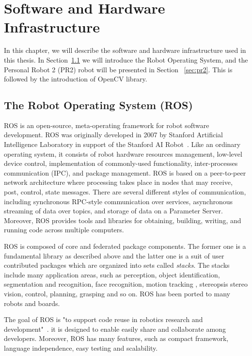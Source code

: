 \chapter{Software and Hardware Infrastructure}
\label{chapter:SHI}
In this chapter, we will describe the software and hardware
infrastructure used in this thesis. In Section~\ref{sec:ros} we will introduce the
Robot Operating System, and the Personal Robot 2 (PR2) robot will be presented in Section
~\ref{sec:pr2}. This is followed by the introduction of OpenCV library.

\section{The Robot Operating System (ROS)}
\label{sec:ros}
ROS is an open-source, meta-operating framework for robot software
development. ROS was originally developed in 2007 by Stanford Artificial Intelligence Laboratory in support of the Stanford AI Robot~\cite{quigley2007stair}. Like an ordinary operating system, it consists of  robot
hardware resources management, low-level device control, implementation
of commonly-used functionality, inter-processes communication (IPC), and package
management. ROS is based on a peer-to-peer network architecture where
processing takes place in nodes that may receive, post, control, state
messages. There are several different styles of communication, including synchronous RPC-style communication over services, asynchronous
streaming of data over topics, and storage of data on a Parameter
Server.
Moreover, ROS provides tools and libraries for obtaining, building, writing, and
running code across multiple computers.

ROS is composed of core and federated package components. The former one is a fundamental library as described
above and the latter one is a suit of user contributed packages which
are organized into sets called \textit{stacks}. The stacks include
many application areas, such as  perception, object identification,
segmentation and recognition, face recognition, motion tracking ,
stereopsis stereo vision, control, planning, grasping and so on. ROS has been ported to many robots and boards.

The goal of ROS is "to support code reuse in robotics research and
development"~\cite{rosintroduction}.  it is designed to enable easily
share and collaborate among developers. Moreover, ROS has many
features, such as compact framework, language independence, easy
testing and scalability.

